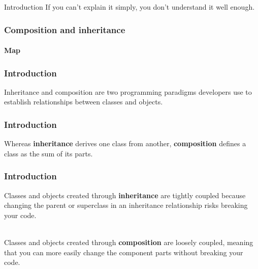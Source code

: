 \begin{sepframe}{Introduction}
    {\scriptsize{If you can't explain it simply, you don't understand it well enough.}}
\end{sepframe}

\begin{frame}[fragile,c]
    \frametitle{Composition and inheritance}
    \framesubtitle{Map}

\end{frame}

\begin{frame}
    \frametitle{Introduction}

    Inheritance and composition are two programming paradigms developers use to establish
    relationships between classes and objects.
\end{frame}

\begin{frame}
    \frametitle{Introduction}

    Whereas \textbf{inheritance} derives one class from another, \textbf{composition} defines
    a class as the sum of its parts.
\end{frame}

\begin{frame}
    \frametitle{Introduction}

    Classes and objects created through \textbf{inheritance} are tightly coupled because
    changing the parent or superclass in an inheritance relationship risks breaking your code.\\~\\

    \pause

    Classes and objects created through \textbf{composition} are loosely coupled, meaning
    that you can more easily change the component parts without breaking your code.
\end{frame}

